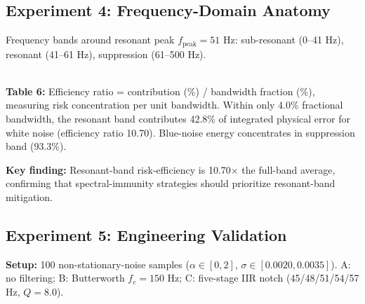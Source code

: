 \documentclass[9pt,twocolumn]{article}
\theoremstyle{remark}
\theoremstyle{definition}
\begin{document}
\subsection{Experiment 4: Frequency-Domain Anatomy}

Frequency bands around resonant peak $f_{\text{peak}}=51$ Hz: sub-resonant (0--41 Hz), resonant (41--61 Hz), suppression (61--500 Hz).

\begin{center}
    \scriptsize
    \\[0.1pt]
    {\scriptsize \textbf{Table 6:} Efficiency ratio = contribution (\%) / bandwidth fraction (\%), measuring risk concentration per unit bandwidth. Within only 4.0\% fractional bandwidth, the resonant band contributes 42.8\% of integrated physical error for white noise (efficiency ratio 10.70). Blue-noise energy concentrates in suppression band (93.3\%).}
\end{center}

\textbf{Key finding:} Resonant-band risk-efficiency is 10.70$\times$ the full-band average, confirming that spectral-immunity strategies should prioritize resonant-band mitigation.

\subsection{Experiment 5: Engineering Validation}

\textbf{Setup:} 100 non-stationary-noise samples ($\alpha\in[0,2]$, $\sigma\in[0.0020,0.0035]$). A: no filtering; B: Butterworth $f_c=150$ Hz; C: five-stage IIR notch (45/48/51/54/57 Hz, $Q=8.0$).
\end{document}
